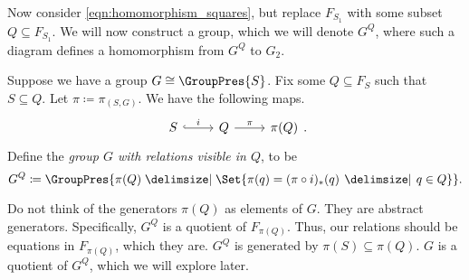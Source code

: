 Now consider \eqref{eqn:homomorphism_squares}, but replace $F_{S_1}$ with some subset $Q \subseteq F_{S_1}$.
We will now construct a group, which we will denote $G^Q$, where such a diagram defines a homomorphism from $G^Q$ to $G_2$.

\begin{definition}
	Suppose we have a group $G \cong \GroupPres{S}$.
	Fix some $Q \subseteq F_S$ such that $S \subseteq Q$.
	Let $\pi \coloneq \pi_{(S,G)}$.
	We have the following maps.
	\[
		\begin{tikzcd}
			S \ar[r, hook, "i"] & Q \ar[r, "\pi"] & \pi(Q)
		\end{tikzcd}
		.\]
	Define the \emph{group $G$ with relations visible in $Q$}, to be
	\[
		G^Q \coloneqq \GroupPres{\pi(Q) \relations \Set{\pi(q) = (\pi \circ i)_*(q) \given q \in Q} }
		.\]
	\label{def:G_Q}
\end{definition}

Do not think of  the generators $\pi(Q)$ as elements of $G$.
They are abstract generators.
Specifically,  $G^Q$ is a quotient of  $F_{\pi(Q)}$.
Thus, our relations should be equations in $F_{\pi(Q)}$, which they are.
$G^Q$ is generated by $\pi(S) \subseteq \pi(Q)$.
$G$ is a quotient of  $G^Q$, which we will explore later.

